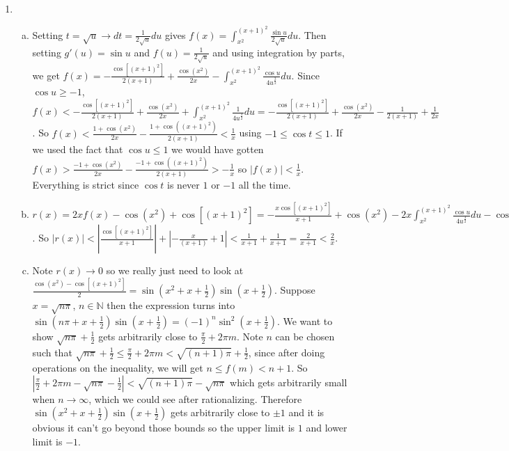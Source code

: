 \documentclass{article}
\begin{document}
\begin{enumerate}
\begin{enumerate}[(a)]
\end{enumerate}
\setcounter{enumi}{12}
\item 
\begin{enumerate}[(a)]
\item Setting $t=\sqrt{u}\rightarrow dt = \frac{1}{2\sqrt{u}} du$ gives $\displaystyle f(x) = \int_{x^2}^{(x+1)^2} \frac{\sin u}{2\sqrt{u}} du$. Then setting $g'(u)=\sin u$ and $f(u)=\frac{1}{2\sqrt{u}}$ and using integration by parts, we get $f(x) = \displaystyle -\frac{\cos [(x+1)^2]}{2(x+1)} + \frac{\cos(x^2)}{2x} - \int_{x^2}^{(x+1)^2} \frac{\cos u}{4 u^{\frac{3}{2}}} du$. Since $\cos u \geq -1$, $f(x) < \displaystyle -\frac{\cos [(x+1)^2]}{2(x+1)} + \frac{\cos(x^2)}{2x} + \int_{x^2}^{(x+1)^2} \frac{1}{4 u^{\frac{3}{2}}} du=\displaystyle -\frac{\cos [(x+1)^2]}{2(x+1)} + \frac{\cos(x^2)}{2x} - \frac{1}{2(x+1)}+\frac{1}{2x}$. So $f(x) < \displaystyle\frac{1+\cos(x^2)}{2x} - \frac{1+\cos((x+1)^2)}{2(x+1)}< \frac{1}{x}$ using $-1 \leq \cos t \leq 1$. If we used the fact that $\cos u \leq 1$ we would have gotten $f(x) > \displaystyle\frac{-1+\cos(x^2)}{2x} - \frac{-1+\cos((x+1)^2)}{2(x+1)}> -\frac{1}{x}$ so $|f(x)| < \displaystyle\frac{1}{x}$. Everything is strict since $\cos t$ is never $1$ or $-1$ all the time.
\item $\displaystyle r(x) = 2x f(x) - \cos(x^2) + \cos[(x+1)^2] = -\frac{x \cos[(x+1)^2]}{x+1}+\cos(x^2) - 2x\int_{x^2}^{(x+1)^2} \frac{\cos u}{4 u^{\frac{3}{2}}} du - \cos (x^2) + \cos[(x+1)^2]=\frac{\cos[(x+1)^2]}{x+1} - 2x\int_{x^2}^{(x+1)^2} \frac{\cos u}{4 u^{\frac{3}{2}}}$. So $\displaystyle|r(x)| < \left|\frac{\cos[(x+1)^2]}{x+1}\right|+\left|-\frac{x}{(x+1)}+1\right|<\frac{1}{x+1}+\frac{1}{x+1} = \frac{2}{x+1} < \frac{2}{x}$.\\
\item Note $r(x)\rightarrow 0$ so we really just need to look at $\frac{\cos (x^2) - \cos [(x+1)^2]}{2}=\sin \left(x^2+x+\frac{1}{2}\right)\sin\left(x+\frac{1}{2}\right)$. Suppose $x=\sqrt{n\pi}$, $n\in\mathbb{N}$ then the expression turns into $\sin(n\pi+x+\frac{1}{2})\sin(x+\frac{1}{2})=(-1)^n \sin^2(x+\frac{1}{2})$. We want to show $\sqrt{n\pi}+\frac{1}{2}$ gets arbitrarily close to $\frac{\pi}{2}+2\pi m$. Note $n$ can be chosen such that $\sqrt{n\pi}+\frac{1}{2} \leq \frac{\pi}{2}+2\pi m < \sqrt{(n+1)\pi}+\frac{1}{2}$, since after doing operations on the inequality, we will get $n\leq f(m) < n+1$. So $\left|\frac{\pi}{2}+2\pi m-\sqrt{n\pi}-\frac{1}{2}\right|<\sqrt{(n+1)\pi}-\sqrt{n\pi}$ which gets arbitrarily small when $n\rightarrow\infty$, which we could see after rationalizing. Therefore $\sin \left(x^2+x+\frac{1}{2}\right)\sin\left(x+\frac{1}{2}\right)$ gets arbitrarily close to $\pm 1$ and it is obvious it can't go beyond those bounds so the upper limit is $1$ and lower limit is $-1$.\\

\end{enumerate}
\end{enumerate}
\end{document}
